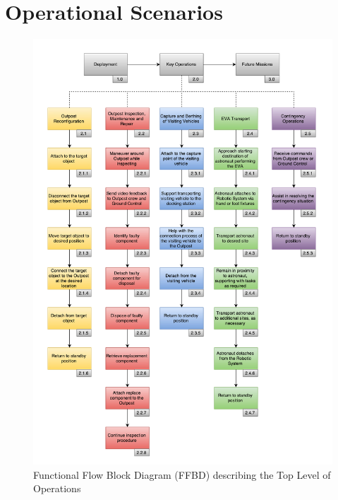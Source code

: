 \documentclass[12pt, letter]{article}
\begin{document}
\section{Operational Scenarios}
\label{scenarios}
\vspace{-12pt}
\begin{figure}[H]
\centering
\includegraphics[height=0.95\textheight]{functionalflow}
\caption{Functional Flow Block Diagram (FFBD) describing the Top Level of Operations}
\label{FFBD}
\end{figure}
\end{document}
